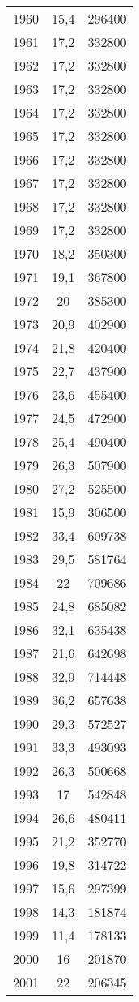 \documentclass[french,11pt]{book}
\begin{document}
\begin{longtable}[t]{ccc}
1960 & 15,4 & 296400\\
1961 & 17,2 & 332800\\
1962 & 17,2 & 332800\\
1963 & 17,2 & 332800\\
1964 & 17,2 & 332800\\
1965 & 17,2 & 332800\\
1966 & 17,2 & 332800\\
1967 & 17,2 & 332800\\
1968 & 17,2 & 332800\\
1969 & 17,2 & 332800\\
1970 & 18,2 & 350300\\
1971 & 19,1 & 367800\\
1972 & 20 & 385300\\
1973 & 20,9 & 402900\\
1974 & 21,8 & 420400\\
1975 & 22,7 & 437900\\
1976 & 23,6 & 455400\\
1977 & 24,5 & 472900\\
1978 & 25,4 & 490400\\
1979 & 26,3 & 507900\\
1980 & 27,2 & 525500\\
1981 & 15,9 & 306500\\
1982 & 33,4 & 609738\\
1983 & 29,5 & 581764\\
1984 & 22 & 709686\\
1985 & 24,8 & 685082\\
1986 & 32,1 & 635438\\
1987 & 21,6 & 642698\\
1988 & 32,9 & 714448\\
1989 & 36,2 & 657638\\
1990 & 29,3 & 572527\\
1991 & 33,3 & 493093\\
1992 & 26,3 & 500668\\
1993 & 17 & 542848\\
1994 & 26,6 & 480411\\
1995 & 21,2 & 352770\\
1996 & 19,8 & 314722\\
1997 & 15,6 & 297399\\
1998 & 14,3 & 181874\\
1999 & 11,4 & 178133\\
2000 & 16 & 201870\\
2001 & 22 & 206345\\

\end{longtable}
\end{document}
